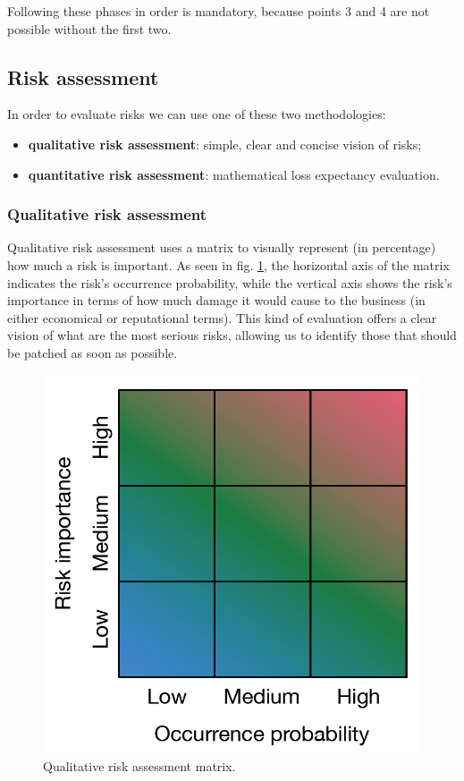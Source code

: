 Following these phases in order is mandatory, because points 3 and 4 are not possible without the first two.


\subsection{Risk assessment}
In order to evaluate risks we can use one of these two methodologies:

\begin{itemize}
    \item \textbf{qualitative risk assessment}: simple, clear and concise vision of risks;
    \item \textbf{quantitative risk assessment}: mathematical loss expectancy evaluation.
\end{itemize}


\subsubsection{Qualitative risk assessment}
Qualitative risk assessment uses a matrix to visually represent (in percentage) how much a risk is important. As seen in fig. \ref{fig:qualrisk}, the horizontal axis of the matrix indicates the risk's occurrence probability, while the vertical axis shows the risk's importance in terms of how much damage it would cause to the business (in either economical or reputational terms). This kind of evaluation offers a clear vision of what are the most serious risks, allowing us to identify those that should be patched as soon as possible.

\begin{figure}[H]
\centering
\includegraphics[scale=0.2]{img/qualitative_risk.png}
\decoRule
\caption{Qualitative risk assessment matrix.}
\label{fig:qualrisk}
\end{figure}

